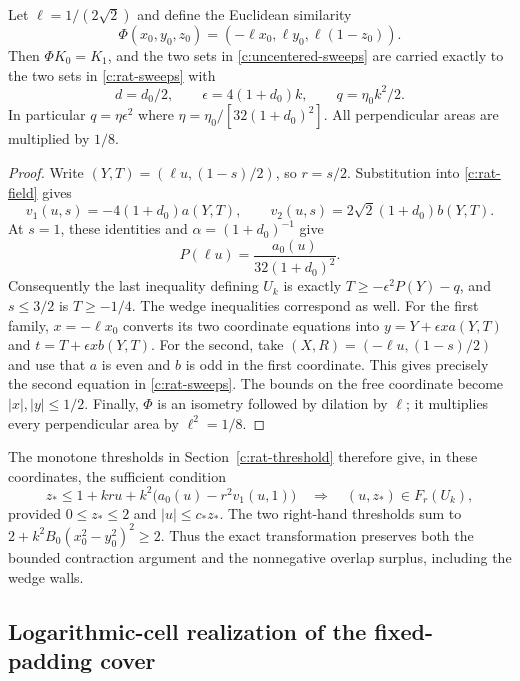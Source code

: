 \begin{proposition}\label{c:rational-coordinate-identity}
Let $\ell=1/(2\sqrt2)$ and define the Euclidean similarity
\[
 \Phi(x_0,y_0,z_0)=(-\ell x_0,\ell y_0,\ell(1-z_0)).
\]
Then $\Phi K_0=K_1$, and the two sets in
\eqref{c:uncentered-sweeps} are carried exactly to the two sets in
\eqref{c:rat-sweeps} with
\begin{equation}\label{c:rational-parameter-dictionary}
 d=d_0/2,\qquad \epsilon=4(1+d_0)k,
 \qquad q=\eta_0 k^2/2.
\end{equation}
In particular $q=\eta\epsilon^2$ where
$\eta=\eta_0/[32(1+d_0)^2]$. All perpendicular areas are multiplied
by $1/8$.
\end{proposition}
\begin{proof}
Write $(Y,T)=(\ell u,(1-s)/2)$, so $r=s/2$.
Substitution into \eqref{c:rat-field} gives
\begin{equation}\label{c:rational-field-dictionary}
 v_1(u,s)=-4(1+d_0)a(Y,T),\qquad
 v_2(u,s)=2\sqrt2(1+d_0)b(Y,T).
\end{equation}
At $s=1$, these identities and
$\alpha=(1+d_0)^{-1}$ give
\[
 P(\ell u)=\frac{a_0(u)}{32(1+d_0)^2}.
\]
Consequently the last inequality defining $U_k$ is exactly
$T\ge-\epsilon^2P(Y)-q$, and $s\le3/2$ is $T\ge-1/4$.
The wedge inequalities correspond as well. For the first family,
$x=-\ell x_0$ converts its two coordinate equations into
$y=Y+\epsilon x a(Y,T)$ and $t=T+\epsilon x b(Y,T)$.
For the second, take $(X,R)=(-\ell u,(1-s)/2)$ and use that $a$
is even and $b$ is odd in the first coordinate. This gives precisely
the second equation in \eqref{c:rat-sweeps}. The bounds on the free
coordinate become $|x|,|y|\le1/2$.
Finally, $\Phi$ is an isometry followed by dilation by $\ell$;
it multiplies every perpendicular area by $\ell^2=1/8$.
\end{proof}

The monotone thresholds in Section~\ref{c:rat-threshold} therefore
give, in these coordinates, the sufficient condition
\begin{equation}\label{c:uncentered-threshold}
 z_*\le 1+kr u+k^2\bigl(a_0(u)-r^2v_1(u,1)\bigr)
       \quad\Longrightarrow\quad (u,z_*)\in F_r(U_k),
\end{equation}
provided $0\le z_*\le2$ and $|u|\le c_*z_*$.
The two right-hand thresholds sum to
$2+k^2 B_0(x_0^2-y_0^2)^2\ge2$.
Thus the exact transformation preserves both the bounded contraction
argument and the nonnegative overlap surplus, including the wedge
walls.

\subsection{Logarithmic-cell realization of the fixed-padding cover}

